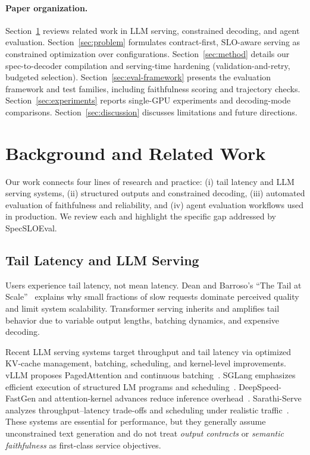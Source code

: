 \documentclass[11pt]{article}
\newcommand{\slo}{\ensuremath{\mathrm{SLO}}}
\begin{document}
\paragraph{Paper organization.}
Section~\ref{sec:background} reviews related work in LLM serving, constrained decoding, and agent evaluation.
Section~\ref{sec:problem} formulates contract-first, \slo-aware serving as constrained optimization over configurations.
Section~\ref{sec:method} details our spec-to-decoder compilation and serving-time hardening (validation-and-retry, budgeted selection).
Section~\ref{sec:eval-framework} presents the evaluation framework and test families, including faithfulness scoring and trajectory checks.
Section~\ref{sec:experiments} reports single-GPU experiments and decoding-mode comparisons.
Section~\ref{sec:discussion} discusses limitations and future directions.

\section{Background and Related Work}
\label{sec:background}

Our work connects four lines of research and practice: (i) tail latency and LLM serving systems, (ii) structured outputs and constrained decoding, (iii) automated evaluation of faithfulness and reliability, and (iv) agent evaluation workflows used in production.
We review each and highlight the specific gap addressed by SpecSLOEval.

\subsection{Tail Latency and LLM Serving}

Users experience tail latency, not mean latency.
Dean and Barroso’s “The Tail at Scale”~\citep{dean2013tail} explains why small fractions of slow requests dominate perceived quality and limit system scalability.
Transformer serving inherits and amplifies tail behavior due to variable output lengths, batching dynamics, and expensive decoding.

Recent LLM serving systems target throughput and tail latency via optimized KV-cache management, batching, scheduling, and kernel-level improvements.
vLLM proposes PagedAttention and continuous batching~\citep{kwon2023vllm}.
SGLang emphasizes efficient execution of structured LM programs and scheduling~\citep{zheng2023sglang}.
DeepSpeed-FastGen and attention-kernel advances reduce inference overhead~\citep{deepspeedFastGen,dao2023flashattention2,prabhu2024vattention}.
Sarathi-Serve analyzes throughput--latency trade-offs and scheduling under realistic traffic~\citep{agrawal2024sarathi}.
These systems are essential for performance, but they generally assume unconstrained text generation and do not treat \emph{output contracts} or \emph{semantic faithfulness} as first-class service objectives.
\end{document}
